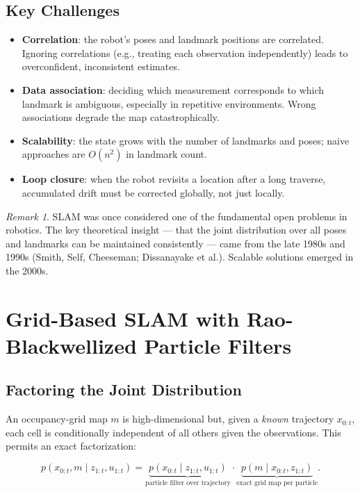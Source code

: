 \documentclass[11pt,a4paper]{article}
\theoremstyle{definition}
\theoremstyle{plain}
\theoremstyle{remark}
\newtheorem*{remark}{Remark}
\begin{document}
\subsection{Key Challenges}

\begin{itemize}
    \item \textbf{Correlation}: the robot's poses and landmark positions are correlated. Ignoring correlations (e.g., treating each observation independently) leads to overconfident, inconsistent estimates.
    \item \textbf{Data association}: deciding which measurement corresponds to which landmark is ambiguous, especially in repetitive environments. Wrong associations degrade the map catastrophically.
    \item \textbf{Scalability}: the state grows with the number of landmarks and poses; naive approaches are $O(n^2)$ in landmark count.
    \item \textbf{Loop closure}: when the robot revisits a location after a long traverse, accumulated drift must be corrected globally, not just locally.
\end{itemize}

\begin{remark}
SLAM was once considered one of the fundamental open problems in robotics. The key theoretical insight --- that the joint distribution over all poses and landmarks can be maintained consistently --- came from the late 1980s and 1990s (Smith, Self, Cheeseman; Dissanayake et al.). Scalable solutions emerged in the 2000s.
\end{remark}

\section{Grid-Based SLAM with Rao-Blackwellized Particle Filters}

\subsection{Factoring the Joint Distribution}

An occupancy-grid map $m$ is high-dimensional but, given a \emph{known} trajectory $x_{0:t}$, each cell is conditionally independent of all others given the observations. This permits an exact factorization:

\begin{tcolorbox}[colback=blue!5!white,colframe=blue!75!black,title=\textbf{Rao-Blackwellization for SLAM}]
\[
    p(x_{0:t}, m \mid z_{1:t}, u_{1:t})
    = \underbrace{p(x_{0:t} \mid z_{1:t}, u_{1:t})}_{\text{particle filter over trajectory}}
      \cdot
      \underbrace{p(m \mid x_{0:t}, z_{1:t})}_{\text{exact grid map per particle}}.
\]
\end{tcolorbox}
\end{document}
